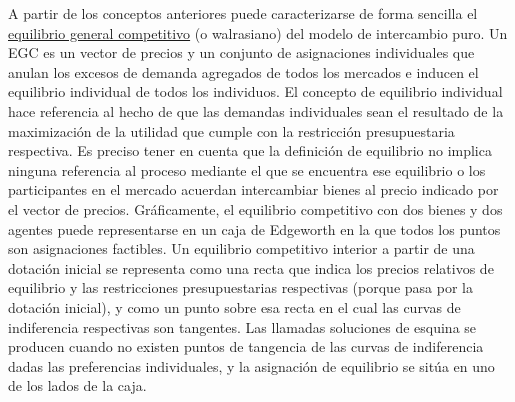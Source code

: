 \documentclass{nuevotema}
\begin{document}
A partir de los conceptos anteriores puede caracterizarse de forma sencilla el \underline{equilibrio general competitivo} (o walrasiano) del modelo de intercambio puro. Un EGC es un vector de precios y un conjunto de asignaciones individuales que anulan los excesos de demanda agregados de todos los mercados e inducen el equilibrio individual de todos los individuos. El concepto de equilibrio individual hace referencia al hecho de que las demandas individuales sean el resultado de la maximización de la utilidad que cumple con la restricción presupuestaria respectiva. Es preciso tener en cuenta que la definición de equilibrio no implica ninguna referencia al proceso mediante el que se encuentra ese equilibrio o los participantes en el mercado acuerdan intercambiar bienes al precio indicado por el vector de precios. Gráficamente, el equilibrio competitivo con dos bienes y dos agentes puede representarse en un caja de Edgeworth en la que todos los puntos son asignaciones factibles. Un equilibrio competitivo interior a partir de una dotación inicial se representa como una recta que indica los precios relativos de equilibrio y las restricciones presupuestarias respectivas (porque pasa por la dotación inicial), y como un punto sobre esa recta en el cual las curvas de indiferencia respectivas son tangentes. Las llamadas soluciones de esquina se producen cuando no existen puntos de tangencia de las curvas de indiferencia dadas las preferencias individuales, y la asignación de equilibrio se sitúa en uno de los lados de la caja.
\end{document}
